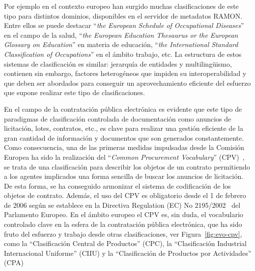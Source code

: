 Por ejemplo en el contexto europeo han surgido muchas clasificaciones de este tipo
para distintos dominios, disponibles en el servidor de metadatos \gls{RAMON}.
Entre ellos se puede destacar ``\textit{the European Schedule of Occupational Diseases}'' en el 
campo de la salud, ``\textit{the European Education Thesaurus or the European Glossary on Education}''
en materia de educación, ``\textit{the International Standard Classification of Occupations}'' en el ámbito trabajo, etc.
La estructura de estos sistemas de clasificación es similar: jerarquía de entidades y multiling\"{u}ismo, contienen sin embargo, 
factores heterogéneos que impiden su interoperabilidad y que deben ser abordados para conseguir un aprovechamiento eficiente del esfuerzo que supone realizar este tipo
de clasificaciones.

En el campo de la contratación pública electrónica es evidente que este tipo
de paradigmas de clasificación controlada de documentación como anuncios de licitación, lotes,
contratos, etc., es clave para realizar una gestión eficiente de la gran cantidad de información
y documentos que son generados constantemente. Como consecuencia, una de las primeras medidas
impulsadas desde la Comisión Europea ha sido la realización del ``\textit{Common Procurement Vocabulary}'' (\gls{CPV})~\cite{cpvguide}, se trata de 
una clasificación para describir los objetos de un contrato permitiendo a los agentes
implicados una forma sencilla de buscar los anuncios de licitación. De esta forma, se ha
conseguido armonizar el sistema de codificación de los objetos de contrato. Además, el uso
del CPV es obligatorio desde el 1 de febrero de 2006 según se establece en la Directiva 
Regulation (EC) No 2195/2002~\cite{r2195} del Parlamento Europeo. En el ámbito europeo el CPV es, sin duda, 
el vocabulario controlado clave en la esfera de la contratación pública electrónica, que
ha sido fruto del esfuerzo y trabajo desde otras clasificaciones, ver Figura~\ref{fig:evo-cpv}, como la ``Clasificación
Central de Productos'' (\gls{CPC}), la ``Clasificación Industrial Internacional Uniforme'' (\gls{CIIU})
y la ``Clasificación de Productos por Actividades'' (\gls{CPA})

